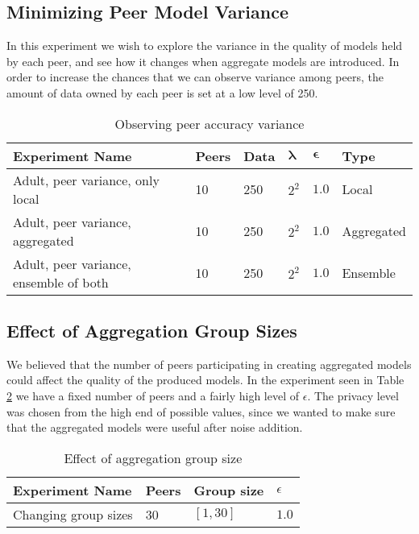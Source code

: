 \subsection{Minimizing Peer Model Variance}

In this experiment we wish to explore the variance in the quality of models held by each peer, and see how it changes when aggregate models are introduced. In order to increase the chances that we can observe variance among peers, the amount of data owned by each peer is set at a low level of 250.

\begin{table}[h]
	\centering
	\label{tab:experiments_peer_variance}
	\begin{tabular}{|l|l|l|l|l|l|}
		{\bf Experiment Name}                  & {\bf Peers} & {\bf Data} & $\boldsymbol{\lambda}$ & $\boldsymbol{\epsilon}$ & {\bf Type} \\
		\hline
		Adult, peer variance, only local       & 10          & 250        & $2^{2}$   & $1.0$      & Local      \\
		Adult, peer variance, aggregated       & 10          & 250        & $2^{2}$   & $1.0$      & Aggregated \\
		Adult, peer variance, ensemble of both & 10          & 250        & $2^{2}$   & $1.0$      & Ensemble  
	\end{tabular}
		\caption{Observing peer accuracy variance}
\end{table}

\subsection{Effect of Aggregation Group Sizes}

We believed that the number of peers participating in creating aggregated models could affect the quality of the produced models. In the experiment seen in Table \ref{tab:experiments_group_sizes} we have a fixed number of peers and a fairly high level of $\epsilon$. The privacy level was chosen from the high end of possible values, since we wanted to make sure that the aggregated models were useful after noise addition.

\begin{table}[h]
	\centering
	\label{tab:experiments_group_sizes}
	\begin{tabular}{|l|l|l|l|}
		{\bf Experiment Name} & {\bf Peers} & {\bf Group size} & $\epsilon$ \\
		\hline
		Changing group sizes  & 30          & $[1, 30]$      &     $1.0$     \\ 
	\end{tabular}
	\caption{Effect of aggregation group size}
\end{table}
 
